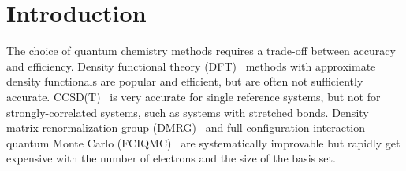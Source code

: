 \documentclass[%
reprint,
 superscriptaddress,
 amsmath,amssymb,
 aps,
]{revtex4-1}
\begin{document}
\maketitle

\section{Introduction}

The choice of quantum chemistry methods requires a trade-off between accuracy and efficiency.
Density functional theory
(DFT)~\cite{ParYan-BOOK-89,DreGro-BOOK-90,kohn1999nobel}
methods with approximate density functionals
are popular and efficient, but are often not sufficiently accurate.  CCSD(T)~\cite{raghavachari1989fifth} is very accurate for single reference systems, but
not for strongly-correlated systems, such as systems with stretched bonds.
Density matrix renormalization group (DMRG)~\cite{white1993density,white1999ab,chan2002highly,chan2011density,ShaCha-JCP-12,olivares2015ab,schollwock2005density,GuoLiCha-JCTC-18}
and full configuration interaction quantum Monte Carlo (FCIQMC)~\cite{BooThoAla-JCP-09,CleBooAla-JCP-10,PetHolChaNigUmr-PRL-12,BooGruKreAla-Nat-13,HolChaUmr-JCTC-16}
are systematically improvable but rapidly get expensive with the number of electrons and the size of the basis set.
\end{document}
